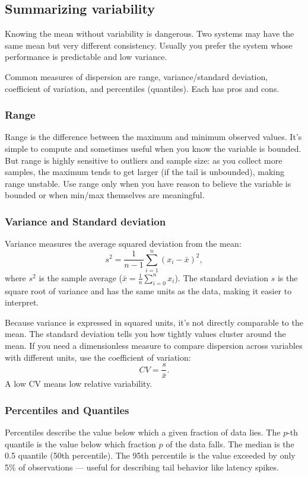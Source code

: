 \subsection{Summarizing variability}
Knowing the mean without variability is dangerous. Two systems may have the same mean but very different consistency. Usually you prefer the system whose performance is predictable and low variance.

Common measures of dispersion are range, variance/standard deviation, coefficient of variation, and percentiles (quantiles). Each has pros and cons.

\subsubsection{Range}
Range is the difference between the maximum and minimum observed values. It’s simple to compute and sometimes useful when you know the variable is bounded. But range is highly sensitive to outliers and sample size: as you collect more samples, the maximum tends to get larger (if the tail is unbounded), making range unstable. Use range only when you have reason to believe the variable is bounded or when min/max themselves are meaningful.

\subsubsection{Variance and Standard deviation}
Variance measures the average squared deviation from the mean:
\begin{equation*}
        s^2 = \frac{1}{n-1}\sum_{i=1}^n(x_i-\bar{x})^2,
\end{equation*}
where $s^2$ is the sample average ($\bar{x}=\frac{1}{n}\sum_{i=0}^nx_i$). The standard deviation $s$ is the square root of variance and has the same units as the data, making it easier to interpret.

Because variance is expressed in squared units, it’s not directly comparable to the mean. The standard deviation tells you how tightly values cluster around the mean. If you need a dimensionless measure to compare dispersion across variables with different units, use the coefficient of variation:
\begin{equation*}
    CV=\frac{s}{\bar{x}}.    
\end{equation*}
A low CV means low relative variability.

\subsubsection{Percentiles and Quantiles}
Percentiles describe the value below which a given fraction of data lies. The $p$-th quantile is the value below which fraction $p$ of the data falls. The median is the 0.5 quantile (50th percentile). The 95th percentile is the value exceeded by only 5\% of observations — useful for describing tail behavior like latency spikes.

